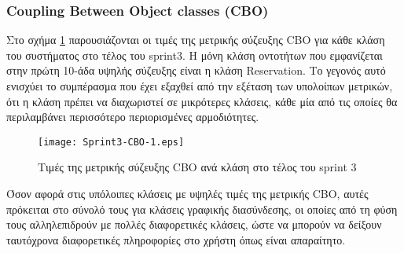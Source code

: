 \subsubsection{Coupling Between Object classes (CBO)}
\label{section:sprint3CBO}

Στο σχήμα \ref{fig:sprint3CBO} παρουσιάζονται οι τιμές της μετρικής
σύζευξης CBO για κάθε κλάση του συστήματος στο τέλος του sprint3.
Η μόνη κλάση οντοτήτων που εμφανίζεται στην πρώτη 10-άδα υψηλής
σύζευξης είναι η κλάση Reservation. Το γεγονός αυτό ενισχύει το
συμπέρασμα που έχει εξαχθεί από την εξέταση των υπολοίπων μετρικών, ότι
η κλάση πρέπει να διαχωριστεί σε μικρότερες κλάσεις, κάθε μία από τις
οποίες θα περιλαμβάνει περισσότερο περιορισμένες αρμοδιότητες.

\begin{figure}
\centering
\texttt{[image: Sprint3-CBO-1.eps]}
\caption{Τιμές της μετρικής σύζευξης CBO ανά κλάση στο τέλος του sprint 3}
\label{fig:sprint3CBO}
\end{figure}

Όσον αφορά στις υπόλοιπες κλάσεις με υψηλές τιμές της μετρικής CBO, αυτές
πρόκειται στο σύνολό τους για κλάσεις γραφικής διασύνδεσης, οι οποίες
από τη φύση τους αλληλεπιδρούν με πολλές διαφορετικές κλάσεις, ώστε να
μπορούν να δείξουν ταυτόχρονα διαφορετικές πληροφορίες στο χρήστη όπως
είναι απαραίτητο.
